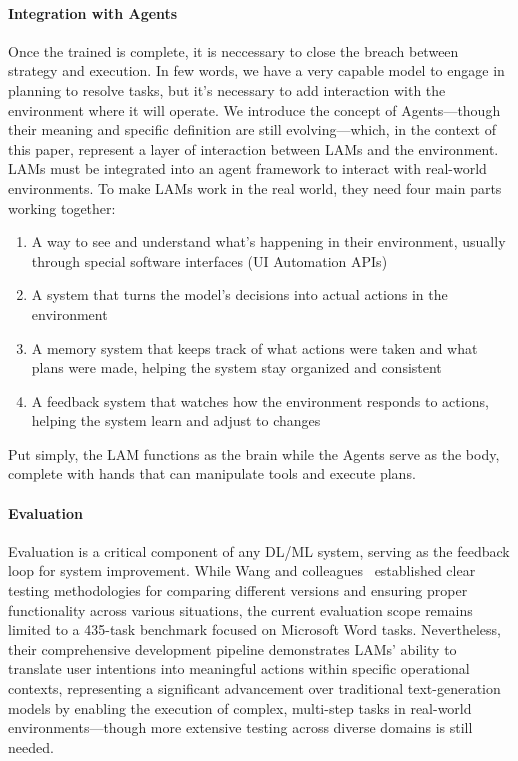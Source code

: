 \documentclass[journal,twoside,10pt]{IEEEtran}
\begin{document}
\paragraph{Integration with Agents}
Once the trained is complete, it is neccessary to close the breach between strategy and execution. In few words, we have a very capable model to engage in planning to resolve tasks, but it's necessary to add interaction with the environment where it will operate. We introduce the concept of Agents—though their meaning and specific definition are still evolving—which, in the context of this paper, represent a layer of interaction between LAMs and the environment. LAMs must be integrated into an agent framework to interact with real-world environments. To make LAMs work in the real world, they need four main parts working together:

\begin{enumerate}
    \item A way to see and understand what's happening in their environment, usually through special software interfaces (UI Automation APIs)
    \item A system that turns the model's decisions into actual actions in the environment
    \item A memory system that keeps track of what actions were taken and what plans were made, helping the system stay organized and consistent
    \item A feedback system that watches how the environment responds to actions, helping the system learn and adjust to changes
\end{enumerate}

Put simply, the LAM functions as the brain while the Agents serve as the body, complete with hands that can manipulate tools and execute plans.

\paragraph{Evaluation}
Evaluation is a critical component of any DL/ML system, serving as the feedback loop for system improvement. While Wang and colleagues~\cite{wang2025lam} established clear testing methodologies for comparing different versions and ensuring proper functionality across various situations, the current evaluation scope remains limited to a 435-task benchmark focused on Microsoft Word tasks. Nevertheless, their comprehensive development pipeline demonstrates LAMs' ability to translate user intentions into meaningful actions within specific operational contexts, representing a significant advancement over traditional text-generation models by enabling the execution of complex, multi-step tasks in real-world environments—though more extensive testing across diverse domains is still needed.
\end{document}
